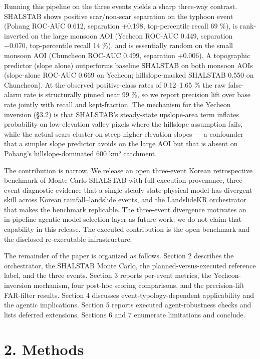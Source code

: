 \documentclass[11pt,a4paper]{article}
\begin{document}
Running this pipeline on the three events yields a sharp three-way contrast. SHALSTAB shows positive scar/non-scar separation on the typhoon event (Pohang ROC-AUC 0.612, separation +0.198, top-percentile recall 69 \%), is rank-inverted on the large monsoon AOI (Yecheon ROC-AUC 0.449, separation −0.070, top-percentile recall 14 \%), and is essentially random on the small monsoon AOI (Chuncheon ROC-AUC 0.499, separation +0.006). A topographic predictor (slope alone) outperforms baseline SHALSTAB on both monsoon AOIs (slope-alone ROC-AUC 0.669 on Yecheon; hillslope-masked SHALSTAB 0.550 on Chuncheon). At the observed positive-class rates of 0.12--1.65 \% the raw false-alarm rate is structurally pinned near 99 \%, so we report precision lift over base rate jointly with recall and kept-fraction. The mechanism for the Yecheon inversion (§3.2) is that SHALSTAB's steady-state upslope-area term inflates probability on low-elevation valley pixels where the hillslope assumption fails, while the actual scars cluster on steep higher-elevation slopes --- a confounder that a simpler slope predictor avoids on the large AOI but that is absent on Pohang's hillslope-dominated 600 km² catchment.

The contribution is narrow. We release an open three-event Korean retrospective benchmark of Monte Carlo SHALSTAB with full execution provenance, three-event diagnostic evidence that a single steady-state physical model has divergent skill across Korean rainfall--landslide events, and the LandslideKR orchestrator that makes the benchmark replicable. The three-event divergence motivates an in-pipeline agentic model-selection layer as future work; we do not claim that capability in this release. The executed contribution is the open benchmark and the disclosed re-executable infrastructure.

The remainder of the paper is organized as follows. Section 2 describes the orchestrator, the SHALSTAB Monte Carlo, the planned-versus-executed reference label, and the three events. Section 3 reports per-event metrics, the Yecheon-inversion mechanism, four post-hoc scoring comparisons, and the precision-lift FAR-filter results. Section 4 discusses event-typology-dependent applicability and the agentic implications. Section 5 reports executed agent-robustness checks and lists deferred extensions. Sections 6 and 7 enumerate limitations and conclude.

\section{2. Methods}\label{methods}
\end{document}
